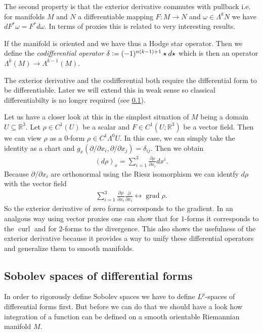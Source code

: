 \documentclass[12pt,a4paper]{article}
\numberwithin{equation}{subsection}
\numberwithin{lemma}{subsection}
\theoremstyle{definition}
\DeclareMathOperator{\curl}{curl}
\DeclareMathOperator{\grad}{grad}
\newcommand{\real}{\mathbb{R}}
\begin{document}
The second property is that the exterior derivative commutes with pullback i.e. 
for manifolds $M$ and $N$ a differentiable mapping $F:M \rightarrow N$ 
and $\omega \in \Lambda^k N$ we have $dF^* \omega = F^* d\omega$. 
In terms of proxies this is related to very interesting results. 

If the manifold is oriented and we have thus a Hodge star operator.
Then we define the \textit{codifferential operator}
$\delta \vcentcolon= (-1)^{n(k-1)+1} \star d \star$ which is then 
an operator $\Lambda^{k}(M) \rightarrow 
\Lambda^{k-1}(M)$.

The exterior derivative and the codifferential both require the differential 
form to be differentiable. Later we will extend this in weak sense so 
classical differentiabilty is no longer required (see \ref{}).

Let us have a closer look at this in the simplest situation of $M$ being a 
domain $U \subseteq \real^3$. Let $\rho \in C^1(U)$ be a scalar
and $F \in C^1(U;\real^3)$ be a vector field. Then we can view 
$\rho$ as a $0$-form $\rho \in C^1\Lambda^0 U$. 
In this case, we can simply take the identity as a chart 
and $g_x(\partial / \partial x_i, \partial / \partial x_j) = \delta_{ij}$.
Then we obtain 
\begin{align*}
    (d\rho)_x = \sum\limits_{i=1}^3 \frac{\partial \rho}{\partial x_i} dx^i. 
\end{align*}
Because $\partial / \partial x_i$ are orthonormal using the Riesz isomorphism
we can identfy $d\rho$ with the vector field
\begin{align*}
    \sum\limits_{i=1}^3 \frac{\partial \rho}{\partial x_i} 
    \frac{\partial }{\partial x_i} 
    \leftrightarrow \grad \rho.
\end{align*}
So the exterior derivative of zero forms corresponds to the gradient.
In an analgous way using vector proxies one can show that for 
$1$-forms it corresponds to the $\curl$ and for $2$-forms to the divergence.
This also shows the usefulness of the exterior derivative because it 
provides a way to unify these differential operators
and generalize them 
to smooth manifolds.


\subsection{Sobolev spaces of differential forms}

In order to rigorously define Sobolev spaces we have to define $L^p$-spaces 
of differential forms first. But before we can do that we should have a look
how integration of a function can be defined on a smooth orientable 
Riemannian manifold $M$. 
\end{document}
